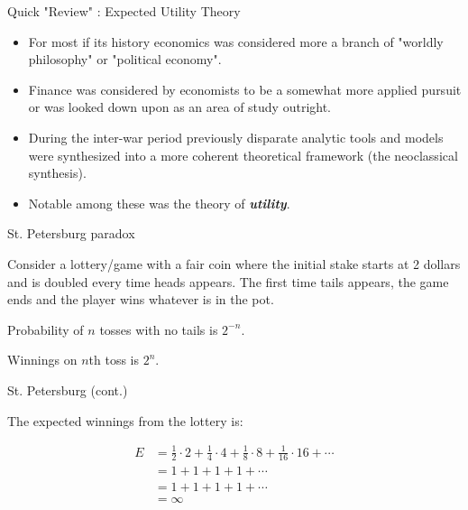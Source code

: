 \documentclass[11pt]{beamer}
\begin{document}
\begin{frame}{Quick "Review" : Expected Utility Theory}

\begin{itemize}

\item For most if its history economics was considered more a branch of "worldly philosophy" or "political economy". %

\vfill

\item Finance was considered by economists to be a somewhat more applied pursuit or was looked down upon as an area of study outright. 

\vfill

\item During the inter-war period previously disparate analytic tools and models were synthesized into a more coherent theoretical framework (the neoclassical synthesis).

\vfill

\item Notable among these was the theory of \textbf{\textit{utility}}. 

\end{itemize}

\end{frame}
\begin{frame}{St. Petersburg paradox}

Consider a lottery/game with a fair coin where the initial stake starts at 2 dollars and is doubled every time heads appears. The first time tails appears, the game ends and the player wins whatever is in the pot. \
\bigskip

Probability  of $n$ tosses with no tails is $2^{-n}$. \

\bigskip
Winnings on $n$th toss is $2^n$. \
\end{frame}

\begin{frame}{St. Petersburg (cont.)}

The expected winnings from the lottery is:

\begin{align*}
E&=\frac{1}{2} \cdot 2+ \frac{1}{4}\cdot 4+\frac{1}{8}\cdot 8+\frac {1}{16}\cdot 16+\cdots \\&=1+1+1+1+\cdots \\
&=1+1+1+1+\cdots \\
&=\infty
\end{align*}

\end{frame}
\end{document}
